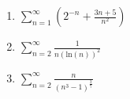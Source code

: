 \documentclass[12pt]{article}
\begin{document}
\begin{enumerate}
\begin{enumerate}
\vfill

\pagebreak 
\item $\displaystyle\sum_{n=1}^\infty \left(2^{-n}+\frac{3n+5}{n^2}\right)$




\vfill

\item $\displaystyle\sum_{n=2}^\infty \frac{1}{n(\mathrm{ln}(n))^2}$


\vfill

\item $\displaystyle\sum_{n=2}^\infty \frac{n}{(n^3-1)^{\frac{3}{7}}}$
\vfill

\end{enumerate} 

\end{enumerate}
\end{document}
